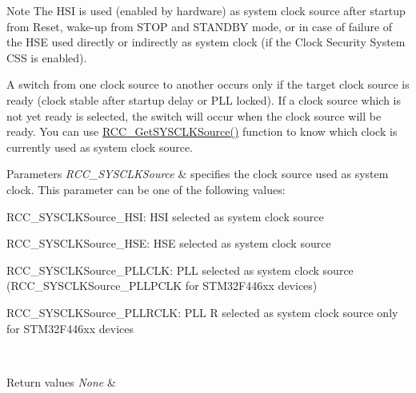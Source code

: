 \begin{DoxyNote}{Note}
The H\+SI is used (enabled by hardware) as system clock source after startup from Reset, wake-\/up from S\+T\+OP and S\+T\+A\+N\+D\+BY mode, or in case of failure of the H\+SE used directly or indirectly as system clock (if the Clock Security System C\+SS is enabled). 

A switch from one clock source to another occurs only if the target clock source is ready (clock stable after startup delay or P\+LL locked). If a clock source which is not yet ready is selected, the switch will occur when the clock source will be ready. You can use \mbox{\hyperlink{group___r_c_c___group2_gaaeb32311c208b2a980841c9c884a41ea}{R\+C\+C\+\_\+\+Get\+S\+Y\+S\+C\+L\+K\+Source()}} function to know which clock is currently used as system clock source. 
\end{DoxyNote}

\begin{DoxyParams}{Parameters}
{\em R\+C\+C\+\_\+\+S\+Y\+S\+C\+L\+K\+Source} & specifies the clock source used as system clock. This parameter can be one of the following values\+: \begin{DoxyItemize}
\item R\+C\+C\+\_\+\+S\+Y\+S\+C\+L\+K\+Source\+\_\+\+H\+SI\+: H\+SI selected as system clock source \item R\+C\+C\+\_\+\+S\+Y\+S\+C\+L\+K\+Source\+\_\+\+H\+SE\+: H\+SE selected as system clock source \item R\+C\+C\+\_\+\+S\+Y\+S\+C\+L\+K\+Source\+\_\+\+P\+L\+L\+C\+LK\+: P\+LL selected as system clock source (R\+C\+C\+\_\+\+S\+Y\+S\+C\+L\+K\+Source\+\_\+\+P\+L\+L\+P\+C\+LK for S\+T\+M32\+F446xx devices) \item R\+C\+C\+\_\+\+S\+Y\+S\+C\+L\+K\+Source\+\_\+\+P\+L\+L\+R\+C\+LK\+: P\+LL R selected as system clock source only for S\+T\+M32\+F446xx devices \end{DoxyItemize}
\\
\hline
\end{DoxyParams}

\begin{DoxyRetVals}{Return values}
{\em None} & \\
\hline
\end{DoxyRetVals}
